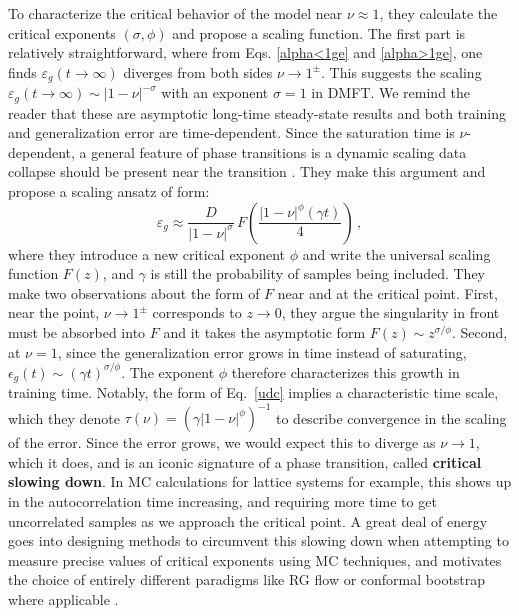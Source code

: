\documentclass[11pt]{article}
\begin{document}
%
%
To characterize the critical behavior of the model near $\nu \approx 1$, they calculate the critical exponents $(\sigma,\phi)$ and propose a scaling function.  The first part is relatively straightforward, where from Eqs. \eqref{alpha<1ge} and \eqref{alpha>1ge}, one finds
$\varepsilon_g(t\to\infty)$ diverges from both sides $\nu\to 1^{\pm}$.  This suggests the scaling $\varepsilon_g(t\to\infty)\sim |1-\nu|^{-\sigma}$ with an exponent $\sigma = 1$ in DMFT.  We remind the reader that these are asymptotic long-time steady-state results and both training and generalization error are time-dependent. Since the saturation time is $\nu$-dependent, a general feature of phase transitions is a dynamic scaling data collapse should be present near the transition \cite{goldenfeldLecturesPhaseTransitions2018a}.  They make this argument and propose a scaling ansatz of form:
\begin{equation}
\varepsilon_g
\approx \frac{D}{|1-\nu|^\sigma}\,
F\!\left(\frac{|1-\nu|^\phi (\gamma t)}{4}\right)\,,
\label{udc}
\end{equation}
where they introduce a new critical exponent $\phi$ and write the universal scaling function $F(z)$, and $\gamma$ is still the probability of samples being included. They make two observations about the form of $F$ near and at the critical point.  First, near the point, $\nu \to 1^{\pm}$ corresponds to $z\to 0$, they argue the singularity in front must be absorbed into $F$ and it takes the asymptotic form $F(z) \sim z^{\sigma/\phi}$.
Second, at $\nu = 1$, since the generalization error grows in time instead of saturating, $\epsilon_g (t) \sim (\gamma t ) ^{\sigma / \phi}$.  The exponent $\phi$ therefore characterizes this growth in training time.
Notably, the form of Eq.~\eqref{udc} implies a characteristic time scale, which they denote $\tau(\nu) = (\gamma |1-\nu|^\phi)^{-1}$ to describe convergence in the scaling of the error.  Since the error grows, we would expect this to diverge as $\nu \to 1$, which it does, and is an iconic signature of a phase transition, called \textbf{critical slowing down}.  In MC calculations for lattice systems for example, this shows up in the autocorrelation time increasing, and requiring more time to get uncorrelated samples as we approach the critical point. A great deal of energy goes into designing methods to circumvent this slowing down when attempting to measure precise values of critical exponents using MC techniques, and motivates the choice of entirely different paradigms like RG flow or conformal bootstrap where applicable \cite{goldenfeldLecturesPhaseTransitions2018a}. 
\end{document}
